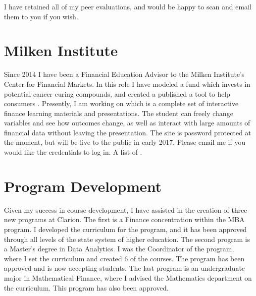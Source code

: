 \documentclass[12pt]{article}
\begin{document}
I have retained all of my peer evaluations, and would be happy to scan and email them to you if you wish.

\section{Milken Institute}

Since 2014 I have been a Financial Education Advisor to the Milken Institute's Center for Financial Markets.  In this role I have modeled a fund which invests in potential cancer curing compounds, and created a published a tool to help consumers \href{https://micfm.shinyapps.io/Housing/}{\color{Blue}{decide how much to spend on a house}}.  Presently, I am working on \href{www.5MinuteFinance.org}{\color{Blue}{www.5MinuteFinance.org}} which is a complete set of interactive finance learning materials and presentations.  The student can freely change variables and see how outcomes change, as well as interact with large amounts of financial data without leaving the presentation.  The site is password protected at the moment, but will be live to the public in early 2017.  Please email me if you would like the credentials to log in.  A list of \href{https://github.com/FinancialMarkets/5MinuteFinance}{\color{Blue}{presentations in development is here}}.

\section{Program Development}
Given my success in course development, I have assisted in the creation of three new programs at Clarion. The first is a Finance concentration within the MBA program.  I developed the curriculum for the program, and it has been approved through all levels of the state system of higher education.  The second program is a Master's degree in Data Analytics. I was the Coordinator of the program, where I set the curriculum and created 6 of the courses.  The program has been approved and is now accepting students.  The last program is an undergraduate major in Mathematical Finance, where I advised the Mathematics department on the curriculum.  This program has also been approved. 
\end{document}
